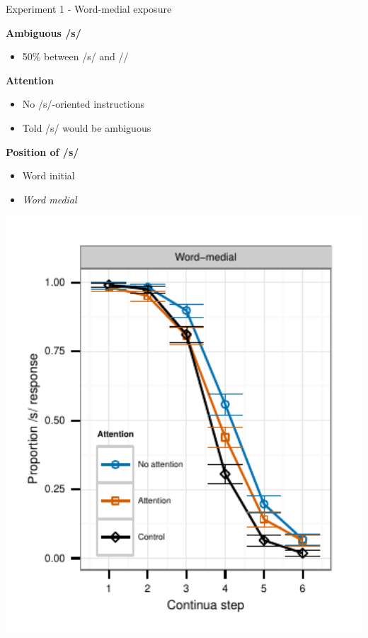 \documentclass{beamer}
\begin{document}
\begin{frame}{Experiment 1 - Word-medial exposure}

\begin{minipage}{0.4\textwidth}
\textbf{Ambiguous /s/}
\begin{itemize}
\item 50\% between /s/ and /\textesh/
\end{itemize}

\textbf{Attention}
\begin{itemize}
\item No /s/-oriented instructions
\item Told /s/ would be ambiguous
\end{itemize}

\textbf{Position of /s/}
\begin{itemize}
\item Word initial
\item \emph{Word medial}
\end{itemize}
\end{minipage}
\hfill
\begin{minipage}{0.53\textwidth}
\includegraphics[width=1.0\textwidth]{graphs/exp1_categresults_present2-final}
\end{minipage}

\end{frame}
\end{document}

